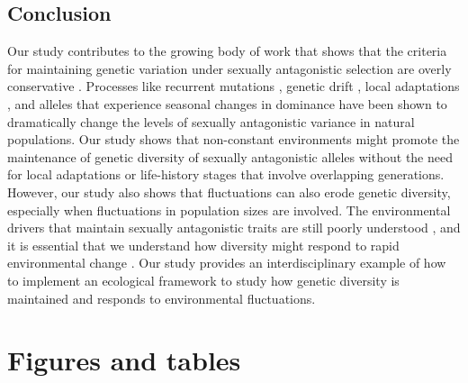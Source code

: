 \subsection*{Conclusion}

Our study contributes to the growing body of work that shows that the criteria for maintaining genetic variation under sexually antagonistic selection are overly conservative \citep{connallon2012general,connallon_evolutionary_2018}. Processes like recurrent mutations \citep{radwan_maintenance_2008}, genetic drift \citep{connallon2012general}, local adaptations \citep{connallon_evolutionary_2018}, and alleles that experience seasonal changes in dominance \citep{wittmann2017seasonally} have been shown to dramatically change the levels of sexually antagonistic variance in natural populations. Our study shows that non-constant environments might promote the maintenance of genetic diversity of sexually antagonistic alleles without the need for local adaptations or life-history stages that involve overlapping generations. However, our study also shows that fluctuations can also erode genetic diversity, especially when fluctuations in population sizes are involved. The environmental drivers that maintain sexually antagonistic traits are still poorly understood \citep{connallon2018environmental}, and it is essential that we understand how diversity might respond to rapid environmental change \citep{tylianakis2008global}. Our study provides an interdisciplinary example of how to implement an ecological framework to study how genetic diversity is maintained and responds to environmental fluctuations.
\clearpage
\section*{Figures and tables }


